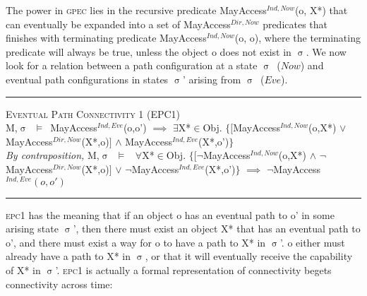 \documentclass[a4paper,11pt, twoside,twocolumn]{article}
\newenvironment{logic}[1][]
{\begin{flushleft} \small }
{\end{flushleft}}
\newcommand{\loin}{$\in$}
\newcommand{\loforall}{$\forall$}
\newcommand{\loexists}{$\exists$}
\newcommand{\loand}{$\land$}
\newcommand{\loor} {$\lor$}
\newcommand{\loimplies}{$\implies$}
\newcommand{\losigma}{$\upsigma$}
\newcommand{\loturns} {$\vDash$}
\newcommand{\loneg}{$\boldsymbol \neg$}
\newcommand{\ablock} {\null\qquad}
\begin{document}
The power in \textsc{gpec} lies in the recursive predicate MayAccess$^{Ind,Now}$(o, X*) that can eventually be expanded into a set of MayAccess$^{Dir,Now}$ predicates that finishes with terminating predicate MayAccess$^{Ind,Now}$(o, o), where the terminating predicate will always be true, unless the object o does not exist in \losigma.
We now look for a relation between a path configuration at a state \losigma\ ($Now$) and eventual path configurations in states \losigma' arising from \losigma\ ($Eve$).\vfill
\begin{minipage}[b]{\linewidth}
\begin{logic}
\hrule\null
\textsc{\normalsize *Eventual Path Connectivity 1 (EPC1)}\\
M,\losigma\ \loturns\ MayAccess$^{Ind,Eve}$(o,o')\linebreak
\ablock \loimplies\linebreak
\ablock \loexists X*\loin Obj. $\{[$MayAccess$^{Ind,Now}$(o,X*)\linebreak
\ablock \ablock \ablock \ablock\loor \linebreak
\ablock \ablock \ablock \quad\: MayAccess$^{Dir,Now}$(X*,o)$]$\linebreak
\ablock \ablock \ablock \quad \loand \linebreak
\ablock \ablock \ablock \quad MayAccess$^{Ind,Eve}$(X*,o')$\}$
\linebreak \\
\textit{By contraposition,}\linebreak
M,\losigma\ \loturns\ \linebreak
\ablock \loforall X*\loin Obj. $\{[$\loneg MayAccess$^{Ind,Now}$(o,X*)\linebreak
\ablock \ablock \ablock \ablock \quad \loand \linebreak
\ablock \ablock \ablock \quad\: \loneg MayAccess$^{Dir,Now}$(X*,o)$]$\linebreak
\ablock \ablock \ablock \quad \loor \linebreak
\ablock \ablock \ablock \quad \loneg MayAccess$^{Ind,Eve}$(X*,o')$\}$\linebreak
\ablock \loimplies\linebreak
	\ablock\loneg MayAccess$^{Ind,Eve}(o,o')$\linebreak
\hrule
\end{logic}
\end{minipage}
\textsc{epc1} has the meaning that if an object o has an eventual path to o' in some arising state \losigma', then there must exist an object X* that has an eventual path to o', and there must exist a way for o to have a path to X* in \losigma'. o either must already have a path to X* in \losigma, or that it will eventually receive the capability of X* in \losigma'. \textsc{epc1} is actually a formal representation of connectivity begets connectivity across time:
\end{document}

